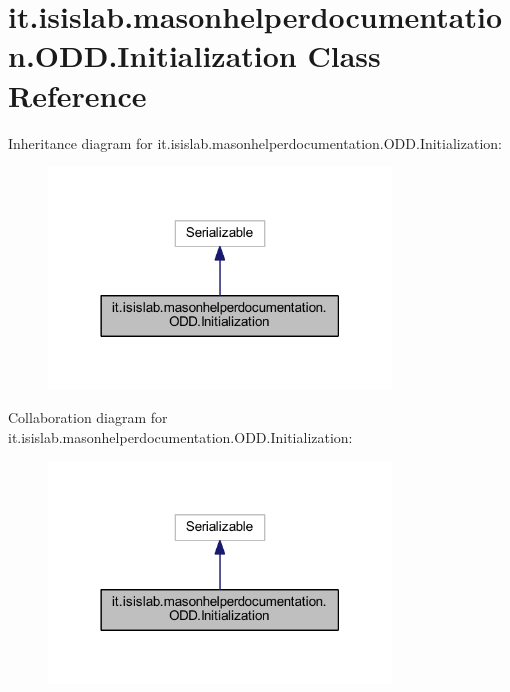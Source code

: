 \hypertarget{classit_1_1isislab_1_1masonhelperdocumentation_1_1_o_d_d_1_1_initialization}{\section{it.\-isislab.\-masonhelperdocumentation.\-O\-D\-D.\-Initialization Class Reference}
\label{classit_1_1isislab_1_1masonhelperdocumentation_1_1_o_d_d_1_1_initialization}
}


Inheritance diagram for it.\-isislab.\-masonhelperdocumentation.\-O\-D\-D.\-Initialization\-:
\nopagebreak
\begin{figure}[H]
\begin{center}
\leavevmode
\includegraphics[width=258pt]{classit_1_1isislab_1_1masonhelperdocumentation_1_1_o_d_d_1_1_initialization__inherit__graph}
\end{center}
\end{figure}


Collaboration diagram for it.\-isislab.\-masonhelperdocumentation.\-O\-D\-D.\-Initialization\-:
\nopagebreak
\begin{figure}[H]
\begin{center}
\leavevmode
\includegraphics[width=258pt]{classit_1_1isislab_1_1masonhelperdocumentation_1_1_o_d_d_1_1_initialization__coll__graph}
\end{center}
\end{figure}
